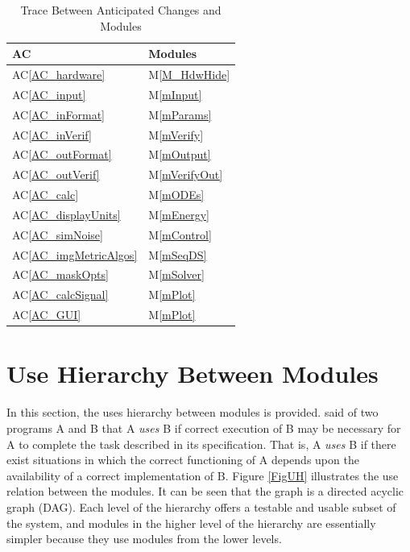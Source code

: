 \documentclass[12pt, titlepage]{article}
\newcommand{\acref}[1]{AC\ref{#1}}
\newcommand{\mref}[1]{M\ref{#1}}
\begin{document}
\begin{table}[H]
\centering
\begin{tabular}{p{} p{}}
\toprule
\textbf{AC} & \textbf{Modules}\\
\midrule
\acref{AC_hardware} & \mref{M_HdwHide}\\
\acref{AC_input} & \mref{mInput}\\
\acref{AC_inFormat} & \mref{mParams}\\
\acref{AC_inVerif} & \mref{mVerify}\\
\acref{AC_outFormat} & \mref{mOutput}\\
\acref{AC_outVerif} & \mref{mVerifyOut}\\
\acref{AC_calc} & \mref{mODEs}\\
\acref{AC_displayUnits} & \mref{mEnergy}\\
\acref{AC_simNoise} & \mref{mControl}\\
\acref{AC_imgMetricAlgos} & \mref{mSeqDS}\\
\acref{AC_maskOpts} & \mref{mSolver}\\
\acref{AC_calcSignal} & \mref{mPlot}\\
\acref{AC_GUI} & \mref{mPlot}\\
\bottomrule
\end{tabular}
\caption{Trace Between Anticipated Changes and Modules}
\label{TblACT}
\end{table}

\section{Use Hierarchy Between Modules} \label{SecUse}

In this section, the uses hierarchy between modules is
provided. \citet{Parnas1978} said of two programs A and B that A {\em uses} B if
correct execution of B may be necessary for A to complete the task described in
its specification. That is, A {\em uses} B if there exist situations in which
the correct functioning of A depends upon the availability of a correct
implementation of B.  Figure \ref{FigUH} illustrates the use relation between
the modules. It can be seen that the graph is a directed acyclic graph
(DAG). Each level of the hierarchy offers a testable and usable subset of the
system, and modules in the higher level of the hierarchy are essentially simpler
because they use modules from the lower levels.
\end{document}
